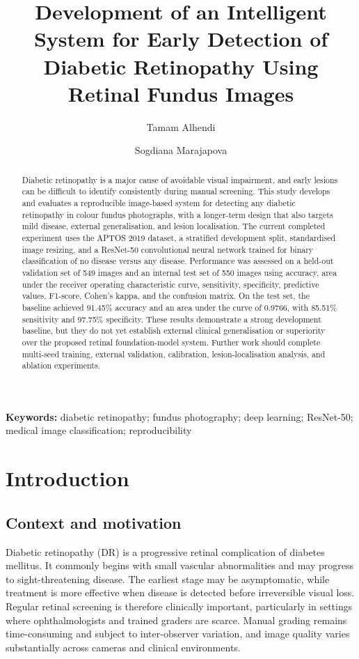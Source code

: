 \documentclass[11pt,a4paper]{article}
\title{Development of an Intelligent System for Early Detection of Diabetic Retinopathy Using Retinal Fundus Images}
\author{Tamam Alhendi \and Sogdiana Marajapova}
\date{}
\begin{document}
\maketitle

\begin{abstract}
Diabetic retinopathy is a major cause of avoidable visual impairment, and early lesions can be difficult to identify consistently during manual screening. This study develops and evaluates a reproducible image-based system for detecting any diabetic retinopathy in colour fundus photographs, with a longer-term design that also targets mild disease, external generalisation, and lesion localisation. The current completed experiment uses the APTOS 2019 dataset, a stratified development split, standardised image resizing, and a ResNet-50 convolutional neural network trained for binary classification of no disease versus any disease. Performance was assessed on a held-out validation set of 549 images and an internal test set of 550 images using accuracy, area under the receiver operating characteristic curve, sensitivity, specificity, predictive values, F1-score, Cohen's kappa, and the confusion matrix. On the test set, the baseline achieved 91.45\% accuracy and an area under the curve of 0.9766, with 85.51\% sensitivity and 97.75\% specificity. These results demonstrate a strong development baseline, but they do not yet establish external clinical generalisation or superiority over the proposed retinal foundation-model system. Further work should complete multi-seed training, external validation, calibration, lesion-localisation analysis, and ablation experiments.
\end{abstract}
\noindent\textbf{Keywords:} diabetic retinopathy; fundus photography; deep learning; ResNet-50; medical image classification; reproducibility

\section{Introduction}
\subsection{Context and motivation}
Diabetic retinopathy (DR) is a progressive retinal complication of diabetes mellitus. It commonly begins with small vascular abnormalities and may progress to sight-threatening disease. The earliest stage may be asymptomatic, while treatment is more effective when disease is detected before irreversible visual loss. Regular retinal screening is therefore clinically important, particularly in settings where ophthalmologists and trained graders are scarce. Manual grading remains time-consuming and subject to inter-observer variation, and image quality varies substantially across cameras and clinical environments.
\end{document}
